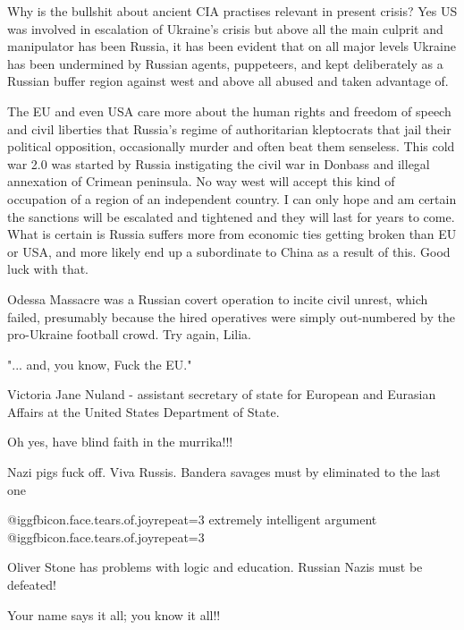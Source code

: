 \begin{itemize}
\begin{itemize}
Why is the bullshit about ancient CIA practises relevant in present crisis? Yes
US was involved in escalation of Ukraine's crisis but above all the main
culprit and manipulator has been Russia, it has been evident that on all major
levels Ukraine has been undermined by Russian agents, puppeteers, and kept
deliberately as a Russian buffer region against west and above all abused and
taken advantage of.

The EU and even USA care more about the human rights and freedom of speech and
civil liberties that Russia's regime of authoritarian kleptocrats that jail
their political opposition, occasionally murder and often beat them senseless.
This cold war 2.0 was started by Russia instigating the civil war in Donbass
and illegal annexation of Crimean peninsula. No way west will accept this kind
of occupation of a region of an independent country. I can only hope and am
certain the sanctions will be escalated and tightened and they will last for
years to come. What is certain is Russia suffers more from economic ties
getting broken than EU or USA, and more likely end up a subordinate to China as
a result of this. Good luck with that.


Odessa Massacre was a Russian covert operation to incite civil unrest, which
failed, presumably because the hired operatives were simply out-numbered by the
pro-Ukraine football crowd. Try again, Lilia.


"... and, you know, Fuck the EU."

Victoria Jane Nuland - assistant secretary of state for European and Eurasian
Affairs at the United States Department of State.

Oh yes, have blind faith in the murrika!!!


Nazi pigs fuck off. Viva Russis. Bandera savages must by eliminated to the last
one


@igg{fbicon.face.tears.of.joy}{repeat=3} extremely intelligent argument
@igg{fbicon.face.tears.of.joy}{repeat=3} 

Oliver Stone has problems with logic and education.
Russian Nazis must be defeated!

Your name says it all; you know it all!!



\end{itemize}
\end{itemize}
